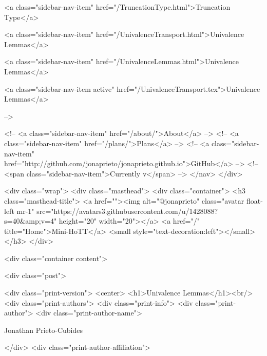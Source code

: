       
    
      
        
          <a class="sidebar-nav-item" href="/TruncationType.html">Truncation Type</a>
        
      
    
      
        
          <a class="sidebar-nav-item" href="/UnivalenceTransport.html">Univalence Lemmas</a>
        
      
    
      
        
          <a class="sidebar-nav-item" href="/UnivalenceLemmas.html">Univalence Lemmas</a>
        
      
    
      
        
          <a class="sidebar-nav-item active" href="/UnivalenceTransport.tex">Univalence Lemmas</a>
        
      
     -->

    <!-- <a class="sidebar-nav-item" href="/about/">About</a> -->
    <!-- <a class="sidebar-nav-item" href="/plans/">Plans</a> -->
    <!-- <a class="sidebar-nav-item" href="http://github.com/jonaprieto/jonaprieto.github.io">GitHub</a> -->
    <!-- <span class="sidebar-nav-item">Currently v</span> -->
  </nav>
</div>

    <div class="wrap">
      <div class="masthead">
        <div class="container">
          <h3 class="masthead-title">
            <a href=""><img alt="@jonaprieto" class="avatar float-left mr-1" src="https://avatars3.githubusercontent.com/u/1428088?s=40&amp;v=4" height="20" width="20"></a>
            <a href="/" title="Home">Mini-HoTT</a>
            <small style="text-decoration:left"></small>
          </h3>
        </div>
      
      <div class="container content">
        







<div class="post">

  <div class="print-version">
    <center>
      <h1>Univalence Lemmas</h1><br/>
        <div class="print-authors">
          <div class="print-info">
            <div class="print-author">
              <div class="print-author-name">
                
                  Jonathan Prieto-Cubides
                
              </div>
              <div class="print-author-affiliation">
                
